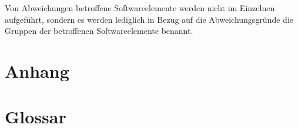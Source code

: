 \documentclass[parskip=full]{scrartcl}
\begin{document}
Von Abweichungen betroffene Softwareelemente werden nicht im Einzelnen aufgeführt, sondern es werden lediglich in Bezug auf die Abweichungsgründe die Gruppen der betroffenen Softwareelemente benannt.

\section{Anhang}



\clearpage
\section{Glossar}\label{glossar}

\renewcommand*{\glossarysection}[2][]{}	%
\printnoidxglossaries				%
\end{document}
